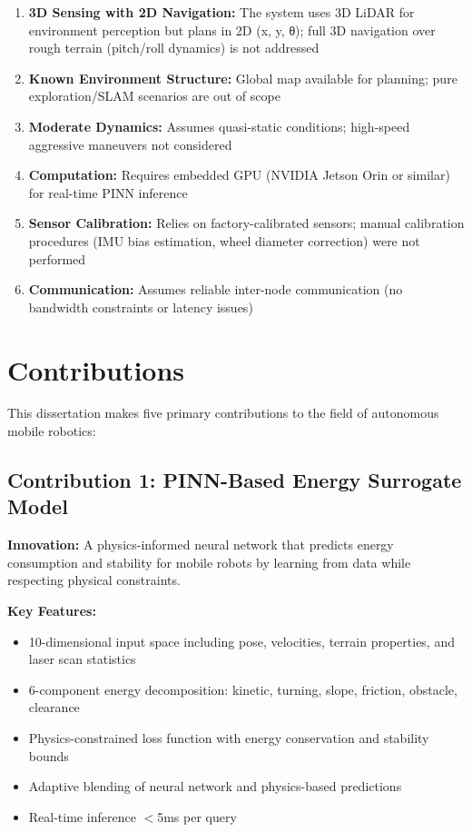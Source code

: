 \begin{enumerate}
    \item \textbf{3D Sensing with 2D Navigation:} The system uses 3D LiDAR for environment perception but plans in 2D (x, y, θ); full 3D navigation over rough terrain (pitch/roll dynamics) is not addressed
    \item \textbf{Known Environment Structure:} Global map available for planning; pure exploration/SLAM scenarios are out of scope
    \item \textbf{Moderate Dynamics:} Assumes quasi-static conditions; high-speed aggressive maneuvers not considered
    \item \textbf{Computation:} Requires embedded GPU (NVIDIA Jetson Orin or similar) for real-time PINN inference
    \item \textbf{Sensor Calibration:} Relies on factory-calibrated sensors; manual calibration procedures (IMU bias estimation, wheel diameter correction) were not performed
    \item \textbf{Communication:} Assumes reliable inter-node communication (no bandwidth constraints or latency issues)
\end{enumerate}

\section{Contributions}
\label{sec:contributions}

This dissertation makes five primary contributions to the field of autonomous mobile robotics:

\subsection{Contribution 1: PINN-Based Energy Surrogate Model}

\textbf{Innovation:} A physics-informed neural network that predicts energy consumption and stability for mobile robots by learning from data while respecting physical constraints.

\textbf{Key Features:}
\begin{itemize}
    \item 10-dimensional input space including pose, velocities, terrain properties, and laser scan statistics
    \item 6-component energy decomposition: kinetic, turning, slope, friction, obstacle, clearance
    \item Physics-constrained loss function with energy conservation and stability bounds
    \item Adaptive blending of neural network and physics-based predictions
    \item Real-time inference $<$5ms per query
\end{itemize}

